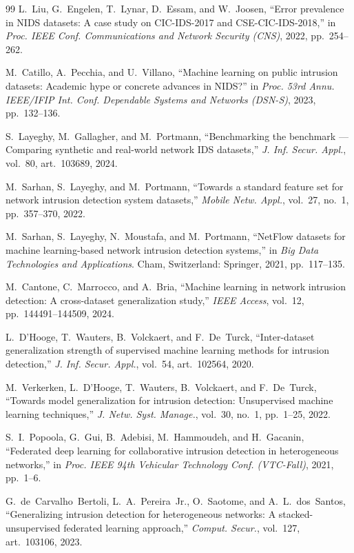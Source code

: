 \documentclass[11pt,a4paper]{article}
\begin{document}
\begin{thebibliography}{99}
 L.~Liu, G.~Engelen, T.~Lynar, D.~Essam, and W.~Joosen, ``Error
prevalence in NIDS datasets: A case study on CIC-IDS-2017 and CSE-CIC-IDS-2018,''
in \emph{Proc. IEEE Conf. Communications and Network Security (CNS)}, 2022,
pp.~254--262.

 M.~Catillo, A.~Pecchia, and U.~Villano, ``Machine learning on
public intrusion datasets: Academic hype or concrete advances in NIDS?'' in
\emph{Proc. 53rd Annu. IEEE/IFIP Int. Conf. Dependable Systems and Networks
(DSN-S)}, 2023, pp.~132--136.

 S.~Layeghy, M.~Gallagher, and M.~Portmann, ``Benchmarking the
benchmark --- Comparing synthetic and real-world network IDS datasets,''
\emph{J. Inf. Secur. Appl.}, vol.~80, art.~103689, 2024.

 M.~Sarhan, S.~Layeghy, and M.~Portmann, ``Towards a standard
feature set for network intrusion detection system datasets,'' \emph{Mobile
Netw. Appl.}, vol.~27, no.~1, pp.~357--370, 2022.

 M.~Sarhan, S.~Layeghy, N.~Moustafa, and M.~Portmann,
``NetFlow datasets for machine learning-based network intrusion detection
systems,'' in \emph{Big Data Technologies and Applications}. Cham, Switzerland:
Springer, 2021, pp.~117--135.

 M.~Cantone, C.~Marrocco, and A.~Bria, ``Machine learning in
network intrusion detection: A cross-dataset generalization study,'' \emph{IEEE
Access}, vol.~12, pp.~144491--144509, 2024.

 L.~D'Hooge, T.~Wauters, B.~Volckaert, and F.~De~Turck,
``Inter-dataset generalization strength of supervised machine learning methods
for intrusion detection,'' \emph{J. Inf. Secur. Appl.}, vol.~54, art.~102564,
2020.

 M.~Verkerken, L.~D'Hooge, T.~Wauters, B.~Volckaert, and
F.~De~Turck, ``Towards model generalization for intrusion detection:
Unsupervised machine learning techniques,'' \emph{J. Netw. Syst. Manage.},
vol.~30, no.~1, pp.~1--25, 2022.

 S.~I.~Popoola, G.~Gui, B.~Adebisi, M.~Hammoudeh, and
H.~Gacanin, ``Federated deep learning for collaborative intrusion detection in
heterogeneous networks,'' in \emph{Proc. IEEE 94th Vehicular Technology Conf.
(VTC-Fall)}, 2021, pp.~1--6.

 G.~de~Carvalho~Bertoli, L.~A.~Pereira~Jr., O.~Saotome, and
A.~L.~dos~Santos, ``Generalizing intrusion detection for heterogeneous networks:
A stacked-unsupervised federated learning approach,'' \emph{Comput. Secur.},
vol.~127, art.~103106, 2023.


\end{thebibliography}
\end{document}
